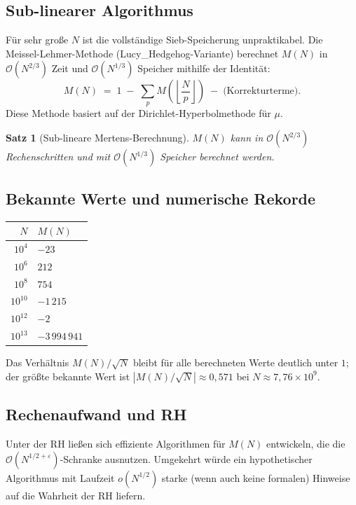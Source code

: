 \documentclass[12pt,a4paper]{amsart}
\newtheorem{theorem}{Satz}[section]
\theoremstyle{definition}
\newcommand{\BigO}{\mathcal{O}}
\begin{document}
\subsection{Sub-linearer Algorithmus}

Für sehr große $N$ ist die vollständige Sieb-Speicherung unpraktikabel.  Die
Meissel-Lehmer-Methode (Lucy\_Hedgehog-Variante) berechnet $M(N)$ in
$\BigO(N^{2/3})$ Zeit und $\BigO(N^{1/3})$ Speicher mithilfe der Identität:
\[
  M(N) \;=\; 1 \;-\; \sum_p M\!\left(\left\lfloor\frac{N}{p}\right\rfloor\right)
            \;-\; \text{(Korrekturterme)}.
\]
Diese Methode basiert auf der Dirichlet-Hyperbolmethode für $\mu$.

\begin{theorem}[Sub-lineare Mertens-Berechnung]
\label{satz:sublinear}
$M(N)$ kann in $\BigO(N^{2/3})$ Rechenschritten und mit $\BigO(N^{1/3})$
Speicher berechnet werden.
\end{theorem}

\subsection{Bekannte Werte und numerische Rekorde}

\begin{center}
\begin{tabular}{rl}
\toprule
$N$ & $M(N)$ \\
\midrule
$10^4$  & $-23$ \\
$10^6$  & $212$ \\
$10^8$  & $754$ \\
$10^{10}$ & $-1\,215$ \\
$10^{12}$ & $-2$ \\
$10^{13}$ & $-3\,994\,941$ \\
\bottomrule
\end{tabular}
\end{center}

Das Verhältnis $M(N)/\sqrt{N}$ bleibt für alle berechneten Werte deutlich
unter $1$; der größte bekannte Wert ist $|M(N)/\sqrt{N}| \approx 0{,}571$
bei $N \approx 7{,}76 \times 10^9$.

\subsection{Rechenaufwand und RH}

Unter der RH ließen sich effiziente Algorithmen für $M(N)$ entwickeln, die
die $\BigO(N^{1/2+\varepsilon})$-Schranke ausnutzen.  Umgekehrt würde ein
hypothetischer Algorithmus mit Laufzeit $o(N^{1/2})$ starke (wenn auch
keine formalen) Hinweise auf die Wahrheit der RH liefern.
\end{document}
